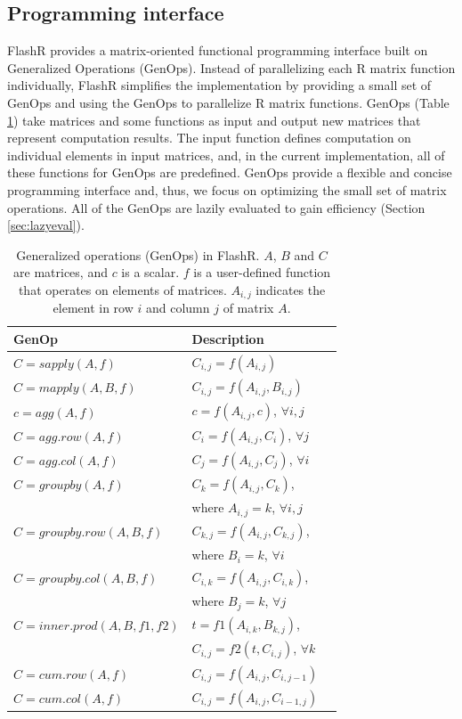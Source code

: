 \subsection{Programming interface} \label{sec:api}

FlashR provides a matrix-oriented functional programming interface built
on Generalized Operations (GenOps). Instead of parallelizing each R matrix 
function individually, FlashR simplifies the implementation by providing
a small set of GenOps and using the GenOps to parallelize R matrix functions.
GenOps (Table \ref{tbl:genops}) take matrices and
some functions as input and output new matrices that represent computation results.
The input function defines computation on individual elements in input matrices,
and, in the current implementation, all of these functions for GenOps are predefined.
GenOps provide a flexible and concise programming interface and, thus,
we focus on optimizing the small set of matrix operations. All of
the GenOps are lazily evaluated to gain efficiency (Section
\ref{sec:lazyeval}).

\begin{table}
\begin{center}
\caption{Generalized operations (GenOps) in FlashR. $A$, $B$ and $C$ are
	matrices, and $c$ is a scalar. $f$ is a user-defined function that
	operates on elements of matrices. $A_{i,j}$ indicates the element
	in row $i$ and column $j$ of matrix $A$.}
\vspace{-10pt}
\footnotesize
\begin{tabular}{|l|l|l|}
\hline
GenOp & Description \\
\hline
$C=sapply(A, f)$ & $C_{i,j}=f(A_{i,j})$ \\
$C=mapply(A, B, f)$ & $C_{i,j}=f(A_{i,j}, B_{i,j})$ \\
\hline
$c=agg(A, f)$ & $c=f(A_{i,j}, c)$, $\forall i, j$ \\
$C=agg.row(A, f)$ & $C_i=f(A_{i,j}, C_i)$, $\forall j$ \\
$C=agg.col(A, f)$ & $C_j=f(A_{i,j}, C_j)$, $\forall i$ \\
\hline
$C=groupby(A, f)$ & $C_{k}=f(A_{i,j}, C_{k})$,\\ & where $A_{i, j}=k$, $\forall i,j$ \\
$C=groupby.row(A, B, f)$ & $C_{k,j}=f(A_{i,j}, C_{k,j})$,\\ & where $B_i=k$, $\forall i$ \\
$C=groupby.col(A, B, f)$ & $C_{i,k}=f(A_{i,j}, C_{i,k})$,\\ & where $B_j=k$, $\forall j$ \\
\hline
$C=inner.prod(A, B, f1, f2)$ & $t=f1(A_{i,k}, B_{k,j})$,
\\ & $C_{i,j}=f2(t, C_{i,j})$, $\forall k$ \\
\hline
$C=cum.row(A, f)$ & $C_{i,j}=f(A_{i,j}, C_{i,j-1})$ \\
$C=cum.col(A, f)$ & $C_{i,j}=f(A_{i,j}, C_{i-1,j})$ \\
\hline
\end{tabular}
\normalsize
\label{tbl:genops}
\vspace{-10pt}
\end{center}
\end{table}


